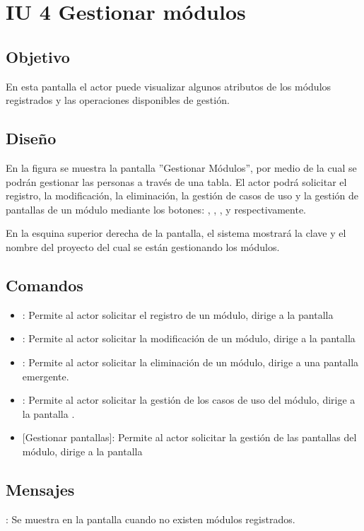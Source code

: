 \section{IU 4 Gestionar módulos}

\subsection{Objetivo}
	En esta pantalla el actor puede visualizar algunos atributos de los módulos registrados y las operaciones disponibles de gestión.
\subsection{Diseño}
	En la figura  se muestra la pantalla ''Gestionar Módulos'', por medio de la cual se podrán gestionar las personas a través de una tabla. El actor podrá solicitar el registro, la modificación, la eliminación, la gestión de casos de uso y la gestión de pantallas de un módulo mediante los botones: , \editar, \eliminar, {\UCsist } y  respectivamente.
	
	En la esquina superior derecha de la pantalla, el sistema mostrará la clave y el nombre del proyecto del cual se están gestionando los módulos.

\subsection{Comandos}
\begin{itemize}
	\item {}: Permite al actor solicitar el registro de un módulo, dirige a la pantalla 
	\item \editar [Modificar]: Permite al actor solicitar la modificación de un módulo, dirige a la pantalla 
	\item \eliminar [Eliminar]: Permite al actor solicitar la eliminación de un módulo, dirige a una pantalla emergente.
	\item {}: Permite al actor solicitar la gestión de los casos de uso del módulo, dirige a la pantalla .
	\item {} [Gestionar pantallas]: Permite al actor solicitar la gestión de las pantallas del módulo, dirige a la pantalla 
\end{itemize}

\subsection{Mensajes}

\begin{Citemize}
	\item {}: Se muestra en la pantalla  cuando no existen módulos registrados.
\end{Citemize}
